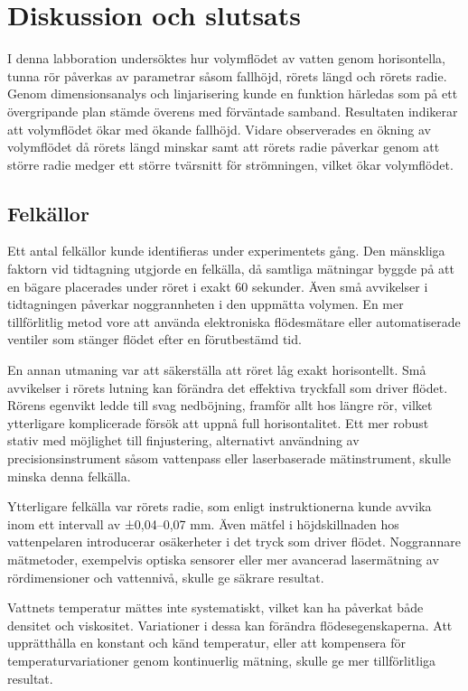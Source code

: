 \documentclass[a4paper,12pt]{article}
\begin{document}
\section{Diskussion och slutsats}

I denna labboration undersöktes hur volymflödet av vatten genom horisontella, tunna rör påverkas av parametrar såsom fallhöjd, rörets längd och rörets radie. Genom dimensionsanalys och linjarisering kunde en funktion härledas som på ett övergripande plan stämde överens med förväntade samband. Resultaten indikerar att volymflödet ökar med ökande fallhöjd. Vidare observerades en ökning av volymflödet då rörets längd minskar samt att rörets radie påverkar genom att större radie medger ett större tvärsnitt för strömningen, vilket ökar volymflödet.

\subsection{Felkällor}
Ett antal felkällor kunde identifieras under experimentets gång. Den mänskliga faktorn vid tidtagning utgjorde en felkälla, då samtliga mätningar byggde på att en bägare placerades under röret i exakt 60 sekunder. Även små avvikelser i tidtagningen påverkar noggrannheten i den uppmätta volymen. En mer tillförlitlig metod vore att använda elektroniska flödesmätare eller automatiserade ventiler som stänger flödet efter en förutbestämd tid.

En annan utmaning var att säkerställa att röret låg exakt horisontellt. Små avvikelser i rörets lutning kan förändra det effektiva tryckfall som driver flödet. Rörens egenvikt ledde till svag nedböjning, framför allt hos längre rör, vilket ytterligare komplicerade försök att uppnå full horisontalitet. Ett mer robust stativ med möjlighet till finjustering, alternativt användning av precisionsinstrument såsom vattenpass eller laserbaserade mätinstrument, skulle minska denna felkälla.

Ytterligare felkälla var rörets radie, som enligt instruktionerna kunde avvika inom ett intervall av ±0,04–0,07 mm. 
Även mätfel i höjdskillnaden hos vattenpelaren introducerar osäkerheter i det tryck som driver flödet. Noggrannare mätmetoder, exempelvis optiska sensorer eller mer avancerad lasermätning av rördimensioner och vattennivå, skulle ge säkrare resultat.

Vattnets temperatur mättes inte systematiskt, vilket kan ha påverkat både densitet och viskositet. Variationer i dessa kan förändra flödesegenskaperna. Att upprätthålla en konstant och känd temperatur, eller att kompensera för temperaturvariationer genom kontinuerlig mätning, skulle ge mer tillförlitliga resultat.
\end{document}
